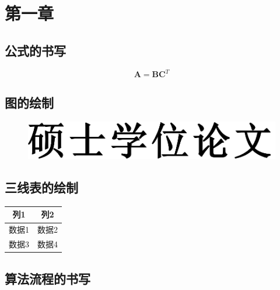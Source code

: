 \chapter{第一章}

\section{公式的书写}

\begin{equation}
\label{eq-1}
    \mathbf{A} = \mathbf{B} \mathbf{C}^T
\end{equation}

\section{图的绘制}

\begin{figure}
    \vspace{1em}
    \centering
    \includegraphics[width=0.7\linewidth]{figures/master-hwzs.pdf}
\end{figure}

\section{三线表的绘制}

\begin{table}[h]
    \centering
    \vspace{0.2cm}
    \wuhao
    \begin{tabular}{cc}
        \hline
        列1 & 列2  \\
        \hline
        数据1 & 数据2 \\
        数据3 & 数据4 \\
        \hline
    \end{tabular}
\end{table}

\section{算法流程的书写}

